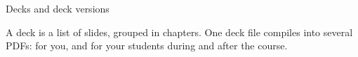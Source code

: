 
\begin{sectionframe}{Decks and deck versions}
	\begin{minipage}{0.9\linewidth}\small
		A deck is a list of slides, grouped in chapters. One deck file compiles into several PDFs: for you, and for your students during and after the course.
	\end{minipage}\par\medskip
	\SMChapterAgenda
\end{sectionframe}
